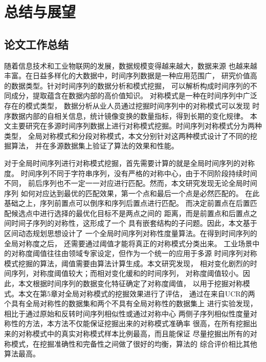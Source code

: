 
\chapter{总结与展望}
\section{论文工作总结}
随着信息技术和工业物联网的发展，数据规模变得越来越大，数据来源
也越来越丰富。在日益多样化的大数据中，时间序列数据是一种应用范围广，
研究价值高的数据类型。针对时间序列的数据分析和模式挖掘，
可以解析构成时间序列的不同成分，提取蕴含在数据内部的高价值知识。
对称模式是一种在时间序列中广泛存在的模式类型，
数据分析从业人员通过挖掘时间序列中的对称模式可以发现
时序数据内部的自相关信息，统计镜像变换的数量指标，得到长期的变化规律。
本文主要研究在多源时间序列数据上进行对称模式挖掘。时间序列对称模式分为两种类型，
全局对称模式和分段对称模式，本文分别针对这两种模式设计了不同的挖掘算法，
并在多源数据集上验证了算法的效果和性能。

对于全局时间序列进行对称模式挖掘，首先需要计算的就是全局时间序列的对称度。
时间序列不同于字符串序列，没有严格的对称中心，由于不同阶段持续时间不同，
前后序列也不一定一一对应进行匹配。然而，本文研究发现无论全局时间序列
如何对应达到最优的匹配效果，第一个点和最后一个点是必然匹配的。
在此基础之上，序列前置点可以倒序和序列后置点进行匹配。
而决定前置点在后置匹配候选点中进行选择的最优化目标不是两点之间的
距离，而是前置点和后置点之间时间子序列的对称性，这形成了一个
具有嵌套结构的子问题。因此，本文基于区间动态规划思想设计了
一个全局时间序列对称性度量算法。在得到时间序列的全局对称度之后，
还需要通过阈值才能将真正的对称模式分类出来。
工业场景中的对称度阈值往往由领域专家设定，但作为一个统一的应用于多源
时间序列对称模式挖掘的算法，阈值需要由算法计算生成。本文研究发现，
相对变化剧烈的时间序列，对称度阈值较大；而相对变化缓和的时间序列，
对称度阈值较小。因此，本文根据时间序列的数据变化特征确定了对称度阈值，
以用于挖掘对称模式。本文在第5章对全局对称模式的挖掘效果进行了评估，
通过在来自UCR的两个具有全局对称性的数据集和两个不具有全局对称性的数据集上
进行实验发现，相比于通过原始和反转时间序列相似性或通过对称中心
两侧子序列相似性度量对称性的方法，本方法不仅能保证挖掘出来的对称模式准确率
很高，在所有挖掘出来的对称模式中的真实对称模式样本比例最高，而且能保证
尽量挖掘出所有的对称模式，在挖掘准确性和完备性之间做了很好的均衡，算法的
综合评价相比其他算法最高。

